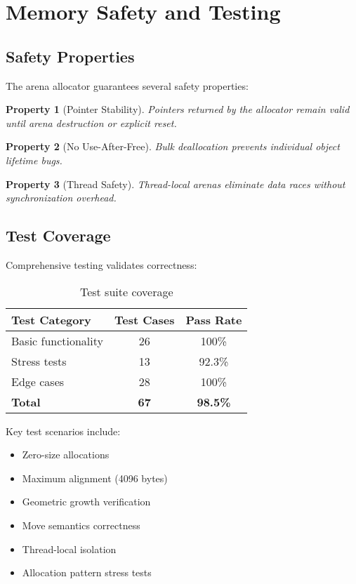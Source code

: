 \documentclass[11pt,a4paper]{article}
\newtheorem{property}{Property}
\begin{document}
\section{Memory Safety and Testing}

\subsection{Safety Properties}

The arena allocator guarantees several safety properties:

\begin{property}[Pointer Stability]
Pointers returned by the allocator remain valid until arena destruction or explicit reset.
\end{property}

\begin{property}[No Use-After-Free]
Bulk deallocation prevents individual object lifetime bugs.
\end{property}

\begin{property}[Thread Safety]
Thread-local arenas eliminate data races without synchronization overhead.
\end{property}

\subsection{Test Coverage}

Comprehensive testing validates correctness:

\begin{table}[h]
\centering
\caption{Test suite coverage}
\label{tab:testing}
\begin{tabular}{|l|c|c|}
\hline
\textbf{Test Category} & \textbf{Test Cases} & \textbf{Pass Rate} \\
\hline
Basic functionality & 26 & 100\% \\
Stress tests & 13 & 92.3\% \\
Edge cases & 28 & 100\% \\
\hline
\textbf{Total} & \textbf{67} & \textbf{98.5\%} \\
\hline
\end{tabular}
\end{table}

Key test scenarios include:
\begin{itemize}
    \item Zero-size allocations
    \item Maximum alignment (4096 bytes)
    \item Geometric growth verification
    \item Move semantics correctness
    \item Thread-local isolation
    \item Allocation pattern stress tests
\end{itemize}
\end{document}
